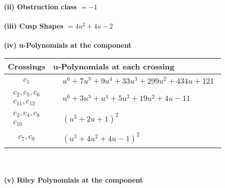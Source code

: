 \documentclass[1p]{elsarticle_modified}
\theoremstyle{definition}
\begin{document}
\flushleft \textbf{(ii) Obstruction class $= -1$}\\~\\
\flushleft \textbf{(iii) Cusp Shapes $= 4 u^2+4 u-2$}\\~\\
\newpage\renewcommand{\arraystretch}{1}
\flushleft \textbf{(iv) u-Polynomials at the component}\newline \\
\begin{tabular}{m{50pt}|m{274pt}}
Crossings & \hspace{64pt}u-Polynomials at each crossing \\
\hline $$\begin{aligned}c_{1}\end{aligned}$$&$\begin{aligned}
&u^6+7 u^5+9 u^4+33 u^3+299 u^2+434 u+121
\end{aligned}$\\
\hline $$\begin{aligned}c_{2},c_{5},c_{6}\\c_{11},c_{12}\end{aligned}$$&$\begin{aligned}
&u^6+3 u^5+u^4+5 u^3+19 u^2+4 u-11
\end{aligned}$\\
\hline $$\begin{aligned}c_{3},c_{4},c_{8}\\c_{10}\end{aligned}$$&$\begin{aligned}
&(u^3+2 u+1)^2
\end{aligned}$\\
\hline $$\begin{aligned}c_{7},c_{9}\end{aligned}$$&$\begin{aligned}
&(u^3+4 u^2+4 u-1)^2
\end{aligned}$\\
\hline
\end{tabular}\\~\\
\newpage\renewcommand{\arraystretch}{1}
\flushleft \textbf{(v) Riley Polynomials at the component}\newline \\
\end{document}
